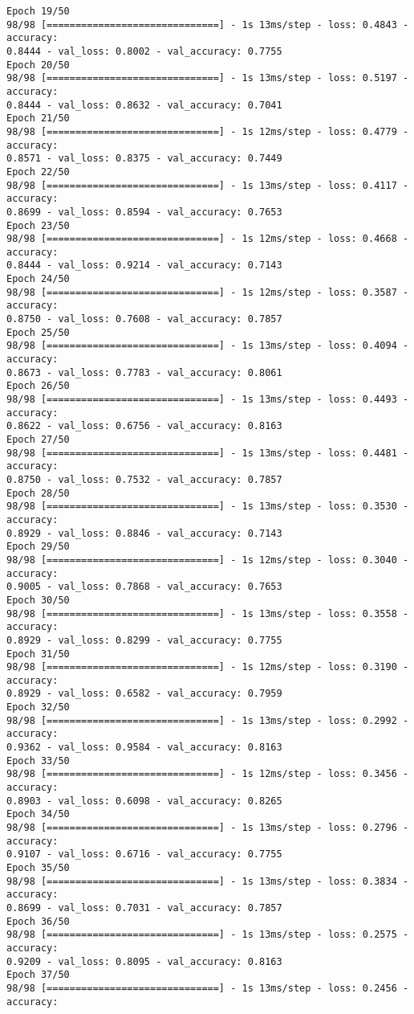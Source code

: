 \begin{verbatim}
Epoch 19/50
98/98 [==============================] - 1s 13ms/step - loss: 0.4843 - accuracy:
0.8444 - val_loss: 0.8002 - val_accuracy: 0.7755
Epoch 20/50
98/98 [==============================] - 1s 13ms/step - loss: 0.5197 - accuracy:
0.8444 - val_loss: 0.8632 - val_accuracy: 0.7041
Epoch 21/50
98/98 [==============================] - 1s 12ms/step - loss: 0.4779 - accuracy:
0.8571 - val_loss: 0.8375 - val_accuracy: 0.7449
Epoch 22/50
98/98 [==============================] - 1s 13ms/step - loss: 0.4117 - accuracy:
0.8699 - val_loss: 0.8594 - val_accuracy: 0.7653
Epoch 23/50
98/98 [==============================] - 1s 12ms/step - loss: 0.4668 - accuracy:
0.8444 - val_loss: 0.9214 - val_accuracy: 0.7143
Epoch 24/50
98/98 [==============================] - 1s 12ms/step - loss: 0.3587 - accuracy:
0.8750 - val_loss: 0.7608 - val_accuracy: 0.7857
Epoch 25/50
98/98 [==============================] - 1s 13ms/step - loss: 0.4094 - accuracy:
0.8673 - val_loss: 0.7783 - val_accuracy: 0.8061
Epoch 26/50
98/98 [==============================] - 1s 13ms/step - loss: 0.4493 - accuracy:
0.8622 - val_loss: 0.6756 - val_accuracy: 0.8163
Epoch 27/50
98/98 [==============================] - 1s 13ms/step - loss: 0.4481 - accuracy:
0.8750 - val_loss: 0.7532 - val_accuracy: 0.7857
Epoch 28/50
98/98 [==============================] - 1s 13ms/step - loss: 0.3530 - accuracy:
0.8929 - val_loss: 0.8846 - val_accuracy: 0.7143
Epoch 29/50
98/98 [==============================] - 1s 12ms/step - loss: 0.3040 - accuracy:
0.9005 - val_loss: 0.7868 - val_accuracy: 0.7653
Epoch 30/50
98/98 [==============================] - 1s 13ms/step - loss: 0.3558 - accuracy:
0.8929 - val_loss: 0.8299 - val_accuracy: 0.7755
Epoch 31/50
98/98 [==============================] - 1s 12ms/step - loss: 0.3190 - accuracy:
0.8929 - val_loss: 0.6582 - val_accuracy: 0.7959
Epoch 32/50
98/98 [==============================] - 1s 13ms/step - loss: 0.2992 - accuracy:
0.9362 - val_loss: 0.9584 - val_accuracy: 0.8163
Epoch 33/50
98/98 [==============================] - 1s 12ms/step - loss: 0.3456 - accuracy:
0.8903 - val_loss: 0.6098 - val_accuracy: 0.8265
Epoch 34/50
98/98 [==============================] - 1s 13ms/step - loss: 0.2796 - accuracy:
0.9107 - val_loss: 0.6716 - val_accuracy: 0.7755
Epoch 35/50
98/98 [==============================] - 1s 13ms/step - loss: 0.3834 - accuracy:
0.8699 - val_loss: 0.7031 - val_accuracy: 0.7857
Epoch 36/50
98/98 [==============================] - 1s 13ms/step - loss: 0.2575 - accuracy:
0.9209 - val_loss: 0.8095 - val_accuracy: 0.8163
Epoch 37/50
98/98 [==============================] - 1s 13ms/step - loss: 0.2456 - accuracy:

\end{verbatim}
